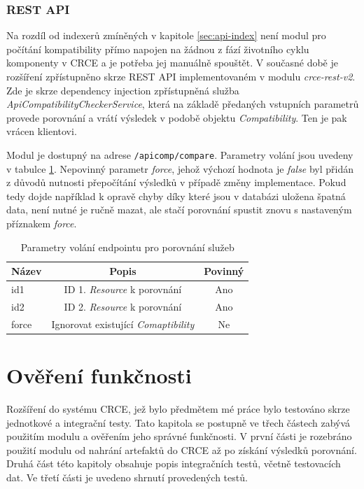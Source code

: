 \documentclass[czech,DP]{thesiskiv}
\begin{document}
\subsection{REST API}

Na rozdíl od indexerů zmíněných v kapitole \ref{sec:api-index} není modul pro počítání kompatibility přímo napojen na žádnou z fází životního cyklu komponenty v CRCE a je potřeba jej manuálně spouštět. V současné době je rozšíření zpřístupněno skrze REST API implementovaném v modulu \textit{crce-rest-v2}. Zde je skrze dependency injection zpřístupněná služba \textit{ApiCompatibilityCheckerService}, která na základě předaných vstupních parametrů provede porovnání a vrátí výsledek v podobě objektu \textit{Compatibility}. Ten je pak vrácen klientovi.

Modul je dostupný na adrese \verb|/apicomp/compare|. Parametry volání jsou uvedeny v tabulce \ref{tab:rest-cmp-params}. Nepovinný parametr \textit{force}, jehož výchozí hodnota je \textit{false} byl přidán z důvodů nutnosti přepočítání výsledků v případě změny implementace. Pokud tedy dojde například k opravě chyby díky které jsou v databázi uložena špatná data, není nutné je ručně mazat, ale stačí porovnání spustit znovu s nastaveným příznakem \textit{force}.

\begin{table}[h]
	\centering
	\begin{tabular} {|l|c|c|}
		\hline
		Název & Popis & Povinný \\
		\hline
		\hline
		id1 & ID 1. \textit{Resource} k porovnání & Ano \\
		\hline
		id2 & ID 2. \textit{Resource} k porovnání & Ano \\
		\hline
		force & Ignorovat existující \textit{Comaptibility} & Ne \\
		\hline		
	\end{tabular}
	\caption{Parametry volání endpointu pro porovnání služeb}
	\label{tab:rest-cmp-params}
\end{table}

\chapter{Ověření funkčnosti}
\label{sec:testing}

Rozšíření do systému CRCE, jež bylo předmětem mé práce bylo testováno skrze jednotkové a integrační testy. Tato kapitola se postupně ve třech částech zabývá použitím modulu a ověřením jeho správné funkčnosti. V první části je rozebráno použití modulu od nahrání artefaktů do CRCE až po získání výsledků porovnání. Druhá část této kapitoly obsahuje popis integračních testů, včetně testovacích dat. Ve třetí části je uvedeno shrnutí provedených testů.
\end{document}
